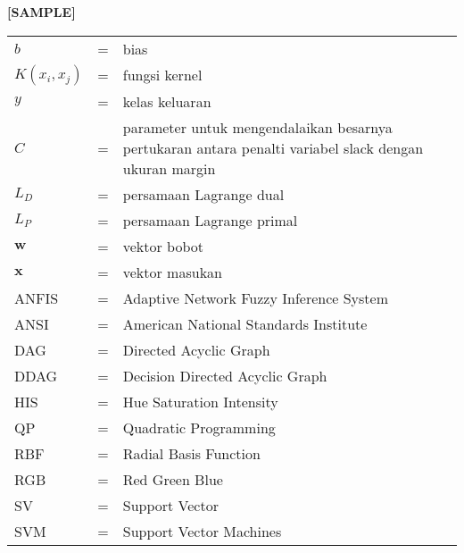 \begin{center}
	\textbf{[SAMPLE]}
\end{center}

\begin{tabular}{llp{3in}}
	$b$	& \hspace{1.5cm} = &	bias \\
	$K(x_i,x_j)$ & \hspace{1.5cm} = & fungsi kernel \\ 
	$y$	& \hspace{1.5cm} = & kelas keluaran \\
	$C$	&  \hspace{1.5cm} = & parameter untuk mengendalaikan besarnya pertukaran antara penalti variabel slack dengan ukuran margin \\
	$L_D$	& \hspace{1.5cm} = & persamaan Lagrange dual \\
	$L_P$	& \hspace{1.5cm}  = &	persamaan Lagrange primal \\
	$\textbf{w}$ &  \hspace{1.5cm} = &	vektor bobot \\
	$\textbf{x}$ &  \hspace{1.5cm} = &	vektor masukan\\
		ANFIS &  \hspace{1.5cm} = &	Adaptive Network Fuzzy Inference System\\
		ANSI	&  \hspace{1.5cm} = &	American National Standards Institute\\
		DAG	&  \hspace{1.5cm} = & Directed Acyclic Graph\\
		DDAG &  \hspace{1.5cm} = & Decision Directed Acyclic Graph\\
		HIS	&  \hspace{1.5cm} = & Hue Saturation Intensity\\
		QP	&  \hspace{1.5cm} = & Quadratic Programming\\
		RBF	&  \hspace{1.5cm} = &	Radial Basis Function\\
		RGB	&  \hspace{1.5cm} = & Red Green Blue\\
		SV	&  \hspace{1.5cm} = &	Support Vector\\
		SVM	&  \hspace{1.5cm} = & Support Vector Machines\\
		
\end{tabular}